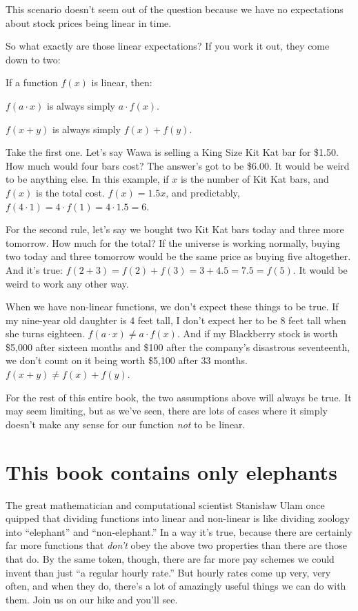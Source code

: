 This scenario doesn't seem out of the question because we have no expectations
about stock prices being linear in time.

\medskip

So what exactly are those linear expectations? If you work it out, they come
down to two:

\begin{framed}
If a function $f(x)$ is linear, then:
\begin{compactitem}
\item $f(a\cdot x)$ is always simply $a\cdot f(x)$.
\item $f(x+y)$ is always simply $f(x)+f(y)$.
\end{compactitem}
\end{framed}

Take the first one. Let's say Wawa is selling a King Size Kit Kat bar for
\$1.50. How much would four bars cost? The answer's got to be \$6.00. It would
be weird to be anything else. In this example, if $x$ is the number of Kit Kat
bars, and $f(x)$ is the total cost. $f(x) = 1.5x$, and predictably, $f(4\cdot
1) = 4 \cdot f(1) = 4 \cdot 1.5 = 6.$

For the second rule, let's say we bought two Kit Kat bars today and three more
tomorrow. How much for the total? If the universe is working normally, buying
two today and three tomorrow would be the same price as buying five altogether.
And it's true: $f(2+3) = f(2) + f(3) = 3 + 4.5 = 7.5 = f(5)$. It would be weird
to work any other way.

When we have non-linear functions, we don't expect these things to be true. If
my nine-year old daughter is 4 feet tall, I don't expect her to be 8 feet tall
when she turns eighteen. $f(a\cdot x) \neq a\cdot f(x)$. And if my Blackberry
stock is worth \$5,000 after sixteen months and \$100 after the company's
disastrous seventeenth, we don't count on it being worth \$5,100 after 33
months. $f(x+y) \neq f(x)+f(y)$.

For the rest of this entire book, the two assumptions above will always be
true. It may seem limiting, but as we've seen, there are lots of cases where it
simply doesn't make any sense for our function \textit{not} to be linear.

\section{This book contains only elephants}


The great mathematician and computational scientist Stanis\l{}aw Ulam once
quipped that dividing functions into linear and non-linear is like dividing
zoology into ``elephant'' and ``non-elephant.'' In a way it's true, because
there are certainly far more functions that \textit{don't} obey the above two
properties than there are those that do. By the same token, though, there are
far more pay schemes we could invent than just ``a regular hourly rate.'' But
hourly rates come up very, very often, and when they do, there's a lot of
amazingly useful things we can do with them. Join us on our hike and you'll
see.

